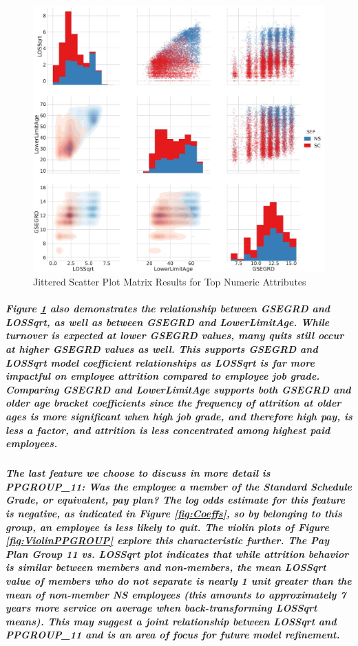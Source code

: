 \documentclass[10pt]{article}
\begin{document}
\subparagraph{}
\begin{figure}[H]
\centering
\includegraphics[width=\linewidth]{ScatterMatrix.jpg}
\caption{Jittered Scatter Plot Matrix Results for Top Numeric Attributes}
\label{fig:ScatterMatrix}
\end{figure}

\subparagraph{Figure \ref{fig:ScatterMatrix} also demonstrates the relationship between GSEGRD and LOSSqrt, as well as between GSEGRD and LowerLimitAge. While turnover is expected at lower GSEGRD values, many quits still occur at higher GSEGRD values as well. This supports GSEGRD and LOSSqrt model coefficient relationships as LOSSqrt is far more impactful on employee attrition compared to employee job grade. Comparing GSEGRD and LowerLimitAge supports both GSEGRD and older age bracket coefficients since the frequency of attrition at older ages is more significant when high job grade, and therefore high pay, is less a factor, and attrition is less concentrated among highest paid employees.}

\subparagraph{The last feature we choose to discuss in more detail is PPGROUP\_11: Was the employee a member of the Standard Schedule Grade, or equivalent, pay plan? The log odds estimate for this feature is negative, as indicated in Figure \ref{fig:Coeffs}, so by belonging to this group, an employee is less likely to quit. The violin plots of Figure \ref{fig:ViolinPPGROUP} explore this characteristic further. The Pay Plan Group 11 vs. LOSSqrt plot indicates that while attrition behavior is similar between members and non-members, the mean LOSSqrt value of members who do not separate is nearly 1 unit greater than the mean of non-member NS employees (this amounts to approximately 7 years more service on average when back-transforming LOSSqrt means). This may suggest a joint relationship between LOSSqrt and PPGROUP\_11 and is an area of focus for future model refinement.}
\end{document}
